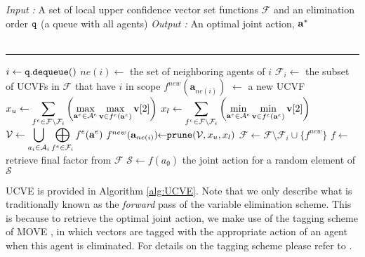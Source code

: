 \documentclass{article}
\begin{document}
\begin{algorithm}[h]
\textit{Input :} A set of local upper confidence vector set functions $\mathcal{F}$ and an elimination order $\tt q$ (a queue with all agents)\newline
 \textit {Output :} An optimal joint action, $\bf a^*$\\\
 \vspace{-2mm}
\hrule
\vspace{2mm}
\begin{algorithmic}[1]
	\STATE $i \leftarrow {\tt q.dequeue}() $
	\STATE $ne(i) \leftarrow$ the set of neighboring agents of $i$
	\STATE $\mathcal{F}_i \leftarrow$ the subset of UCVFs in $\mathcal{F}$ that have $i$ in scope
	\STATE $f^{new}(\mathbf{a}_{ne(i)})$ $\leftarrow$ a new UCVF\label{ln:fny}
	\STATE $\displaystyle x_u \leftarrow \sum_{f^e \in \mathcal{F} \setminus\mathcal{F}_i} \left(\max_{{\bf a}^e \in \mathcal{A}^e} \max_{{\bf v}\in f^e({\bf a}^e)} {\bf v}[2] \right)$ 
	\STATE $\displaystyle x_l \leftarrow \sum_{f^e \in \mathcal{F} \setminus\mathcal{F}_i} \left(\min_{{\bf a}^e \in \mathcal{A}^e} \min_{{\bf v}\in f^e({\bf a}^e)} {\bf v}[2] \right)$ 
	\FORALL{$~~~~\mathbf{a}_{ne(i)} \in \mathcal{A}_{ne(i)}~~~~$}
		\STATE $\displaystyle\mathcal{V} \leftarrow \bigcup_{a_i\in\mathcal{A}_i} \bigoplus_{f^e\in \mathcal{F}_i} f^e({\bf a}^e)$
		\STATE $\!f^{new}({\bf a}_{ne(i)})\!\!\leftarrow\!\!{\tt prune}(\mathcal{V},  x_u, x_l)$ \label{ln:themagic}
	\ENDFOR
	\STATE $ \mathcal{F} \leftarrow \mathcal{F} \setminus \mathcal{F}_i \cup \{ f^{new} \} $
\ENDWHILE \label{ln:elim}
\STATE $ f \leftarrow$ retrieve final factor from $\mathcal{F} $ \label{ln:retr}
\STATE $\mathcal{S} \leftarrow f(a_\emptyset)$ \label{ln:getset}
\STATE {\bf return} {the joint action for a random element of $\mathcal{S}$}
\end{algorithmic}
\caption{$\mathtt{UCVE}(\mathcal{\mathcal{F}})$}
\label{alg:UCVE}
\end{algorithm}

UCVE is provided in Algorithm \ref{alg:UCVE}. Note that we only describe what is traditionally known as the \emph{forward} pass of the variable elimination scheme. This is because to retrieve the optimal joint action, we make use of the tagging scheme of MOVE \cite{roijers13computing,roijers2015computing}, in which vectors are tagged with the appropriate action of an agent when this agent is eliminated. For details on the tagging scheme please refer to \cite{roijers13computing}.  
\end{document}
